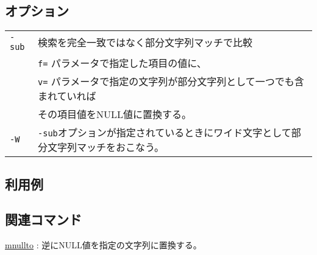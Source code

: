 \subsection*{オプション}
\begin{table}[htbp]
{\small
\begin{tabular}{ll}
\verb|-sub|    & 検索を完全一致ではなく部分文字列マッチで比較\\
               & \verb|f=| パラメータで指定した項目の値に、\\
               & \verb|v=| パラメータで指定の文字列が部分文字列として一つでも含まれていれば\\
               & その項目値をNULL値に置換する。\\
\verb|-W|      & \verb|-sub|オプションが指定されているときにワイド文字として部分文字列マッチをおこなう。\\
\end{tabular} 
}
\end{table} 

\subsection*{利用例}

\subsection*{関連コマンド}
\hyperref[sect:mnullto]{mnullto} : 逆にNULL値を指定の文字列に置換する。

%
